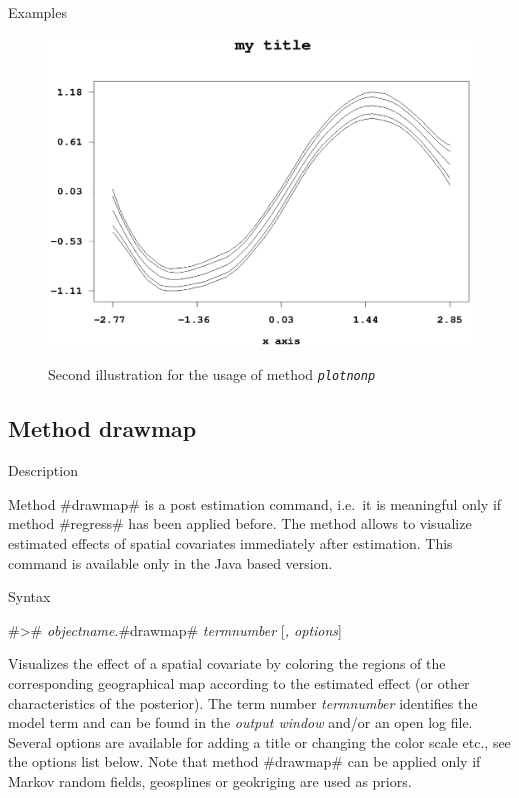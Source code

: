 \begin{stanza}{Examples}
\begin{figure}[ht]
\begin{center}
\includegraphics[scale=0.8]{grafiken/plotnonpexample2.ps}
{\em\caption{ \label{plotnonpexample2} Second illustration for the
usage of method \em\tt plotnonp}}
\end{center}
\end{figure}

\end{stanza}

\clearpage

\subsection{Method drawmap} \label{drawmap}

\begin{stanza}{Description}

Method #drawmap# is a post estimation command, i.e.~it is
meaningful only if method #regress# has been applied before. The
method allows to visualize estimated effects of spatial covariates
immediately after estimation. This command is available only in
the Java based version.

\end{stanza}

\begin{stanza}{Syntax}

#># {\em objectname}.#drawmap# {\em termnumber} [{\em , options}]

Visualizes the effect of a spatial covariate by coloring the
regions of the corresponding geographical map according to the
estimated effect (or other characteristics of the posterior). The
term number {\em termnumber} identifies the model term and can be
found in the {\em output window} and/or an open log file. Several
options are available for adding a title or changing the color
scale etc., see the options list below. Note that method #drawmap#
can be applied only if Markov random fields, geosplines or
geokriging are used as priors.

\end{stanza}


